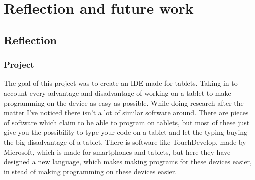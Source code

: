 \documentclass[a4paper,12pt]{report}
\begin{document}

\chapter{Reflection and future work}

\section{Reflection}
\subsection{Project}
The goal of this project was to create an IDE made for tablets. Taking in to account every advantage and disadvantage of working on a tablet to make programming on the device as easy as possible. While doing research 
after the matter I've noticed there isn't a lot of similar software around. There are pieces of software which claim to be able to program on tablets, but most of these just give you the possibility to type your code on
a tablet and let the typing buying the big disadvantage of a tablet. There is software like TouchDevelop, made by Microsoft, which is made for smartphones and tablets, but here they have designed a new language, which makes 
making programs for these devices easier, in stead of making programming on these devices easier.
\end{document}
